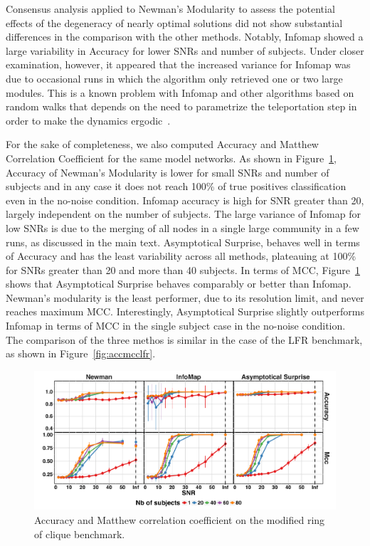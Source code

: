 Consensus analysis applied to Newman's Modularity to assess the potential effects of the degeneracy of nearly optimal solutions did not show substantial differences in the comparison with the other methods.
Notably, Infomap showed a large variability in Accuracy for lower SNRs and number of subjects.
Under closer examination, however, it appeared that the increased variance for Infomap was due to occasional runs in which the algorithm only retrieved one or two large modules.
This is a known problem with Infomap and other algorithms based on random walks that depends on the need to parametrize the teleportation step in order to make the dynamics ergodic~\cite{lambiotte2012}.

For the sake of completeness, we also computed Accuracy and Matthew Correlation Coefficient for the same model networks.
As shown in Figure~\ref{fig:accmcc_cliques}, Accuracy of Newman's Modularity is lower for small SNRs and number of subjects and in any case it does not reach 100\% of true positives classification even in the no-noise condition. Infomap accuracy is high for SNR greater than 20, largely independent on the number of subjects. The large variance of Infomap for low SNRs is due to the merging of all nodes in a single large community in a few runs, as discussed in the main text. Asymptotical Surprise, behaves well in terms of Accuracy and has the least variability across all methods, plateauing at 100\% for SNRs greater than 20 and more than 40 subjects.
In terms of MCC, Figure~\ref{fig:accmcc_cliques} shows that Asymptotical Surprise behaves comparably or better than Infomap.
Newman's modularity is the least performer, due to its resolution limit, and never reaches maximum MCC. Interestingly, Asymptotical Surprise slightly outperforms Infomap in terms of MCC in the single subject case in the no-noise condition.
The comparison of the three methos is similar in the case of the LFR benchmark, as shown in Figure~\ref{fig:accmcclfr}.
\begin{figure}[htb!]
\centering
\includegraphics[width=\textwidth]{images/figure3_supplementary.pdf}
\caption{Accuracy and Matthew correlation coefficient on the modified ring of clique benchmark.}
\label{fig:accmcc_cliques}
\end{figure}
